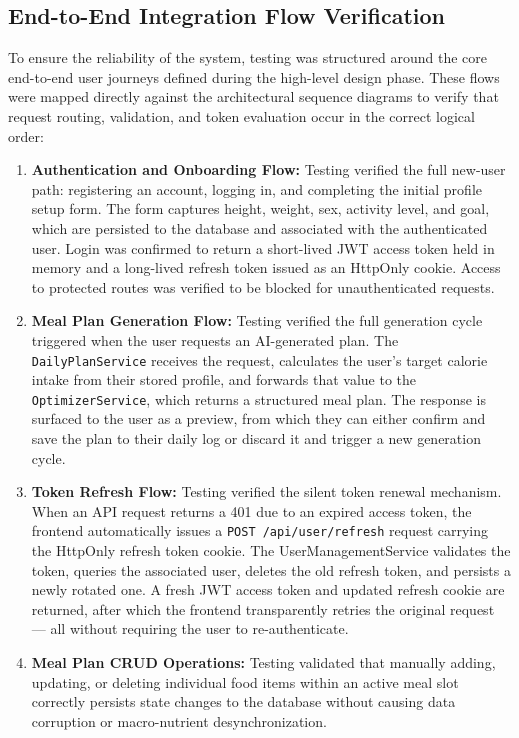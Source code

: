 \subsection{End-to-End Integration Flow Verification}
To ensure the reliability of the system, testing was structured around the core end-to-end 
user journeys defined during the high-level design phase. These flows were mapped directly 
against the architectural sequence diagrams to verify that request routing, validation, 
and token evaluation occur in the correct logical order:

\begin{enumerate}
    \item \textbf{Authentication and Onboarding Flow:} Testing verified the full new-user
    path: registering an account, logging in, and completing the initial profile setup form.
    The form captures height, weight, sex, activity level, and goal, which are persisted to
    the database and associated with the authenticated user. Login was confirmed to return a
    short-lived JWT access token held in memory and a long-lived refresh token issued as an
    HttpOnly cookie. Access to protected routes was verified to be blocked for unauthenticated
    requests.
    \item \textbf{Meal Plan Generation Flow:} Testing verified the full generation cycle
    triggered when the user requests an AI-generated plan. The \texttt{DailyPlanService}
    receives the request, calculates the user's target calorie intake from their stored
    profile, and forwards that value to the \newline\texttt{OptimizerService}, which 
    returns a structured meal plan. The response is surfaced to the user as a preview, 
    from which they can either confirm and save the plan to their daily log or discard 
    it and trigger a new generation cycle.
    \item \textbf{Token Refresh Flow:} Testing verified the silent token renewal mechanism.
    When an API request returns a 401 due to an expired access token, the frontend
    automatically issues a \texttt{POST /api/user/refresh} request carrying the HttpOnly
    refresh token cookie. The UserManagementService validates the token, 
    queries the associated user, deletes the old refresh token, and persists a newly rotated 
    one. A fresh JWT access token and updated refresh cookie are returned, after which the 
    frontend transparently retries the original request — all without requiring the user to
    re-authenticate.
    \item \textbf{Meal Plan CRUD Operations:} Testing validated that manually adding,
    updating, or deleting individual food items within an active meal slot correctly
    persists state changes to the database without causing data corruption or
    macro-nutrient desynchronization.
\end{enumerate}

